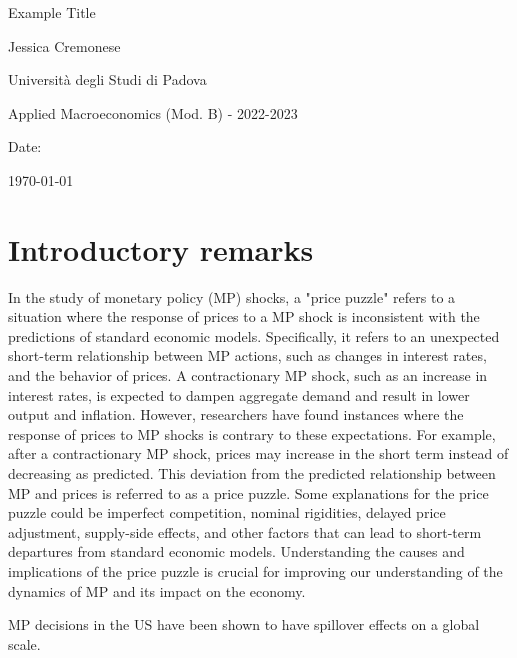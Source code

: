 \documentclass[10pt,a4paper,draft]{article}
\begin{document}
\begin{titlepage}
    \centering
    \vspace*{2cm}
    {\LARGE Example Title \par}
    \vspace{2cm}
    {\large Jessica Cremonese \par}
    \vspace{1cm}
    {\large Università degli Studi di Padova \par}
    \vspace{1cm}
    {\large Applied Macroeconomics (Mod. B) - 2022-2023 \par}
    \vspace{1cm}
    {\large Date: \par}
    {\large \today \par}
\end{titlepage}


\newpage
\section{Introductory remarks}

In the study of monetary policy (MP) shocks, a "price puzzle" refers to a situation where the response of prices to a MP shock is inconsistent with the predictions of standard economic models. Specifically, it refers to an unexpected short-term relationship between MP actions, such as changes in interest rates, and the behavior of prices. A contractionary MP shock, such as an increase in interest rates, is expected to dampen aggregate demand and result in lower output and inflation. However, researchers have found instances where the response of prices to MP shocks is contrary to these expectations. For example, after a contractionary MP shock, prices may increase in the short term instead of decreasing as predicted. This deviation from the predicted relationship between MP and prices is referred to as a price puzzle. Some explanations for the price puzzle could be imperfect competition, nominal rigidities, delayed price adjustment, supply-side effects, and other factors that can lead to short-term departures from standard economic models. Understanding the causes and implications of the price puzzle is crucial for improving our understanding of the dynamics of MP and its impact on the economy.


MP decisions in the US have been shown to have spillover effects on a global scale. 
\end{document}
